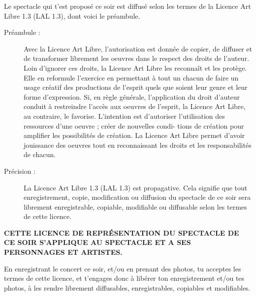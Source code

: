 Le spectacle qui t'est propos\'e ce soir est diffus\'e selon les
termes de la Licence Art Libre 1.3 (LAL 1.3), dont voici le
pr\'eambule.

\begin{description}
  \item[Pr\'eambule :] Avec la Licence Art Libre, l'autorisation est
  donn\'ee de copier, de diffuser et de transformer librement les
  oeuvres dans le respect des droits de l'auteur.  Loin d'ignorer ces
  droits, la Licence Art Libre les reconna\^it et les prot\`ege. Elle
  en reformule l'exercice en permettant \`a tout un chacun de faire un
  usage cr\'eatif des productions de l'esprit quels que soient leur
  genre et leur forme d'expression.  Si, en r\`egle g\'en\'erale,
  l'application du droit d'auteur conduit \`a restreindre l'acc\`es
  aux oeuvres de l'esprit, la Licence Art Libre, au contraire, le
  favorise. L'intention est d'autoriser l'utilisation des ressources
  d'une oeuvre ; cr\'eer de nouvelles condi- tions de cr\'eation pour
  amplifier les possibilit\'es de cr\'eation. La Licence Art Libre
  permet d'avoir jouissance des oeuvres tout en reconnaissant les
  droits et les responsabilit\'es de chacun.

  \item[Pr\'ecision :] La Licence Art Libre 1.3 (LAL 1.3) est
  propagative. Cela signifie que tout enregistrement, copie,
  modification ou diffusion du spectacle de ce soir sera librement
  enregistrable, copiable, modifiable ou diffusable selon les termes
  de cette licence.

\end{description}

\begin{center}
\textbf{CETTE LICENCE DE REPR\'ESENTATION DU SPECTACLE DE CE SOIR S'APPLIQUE AU
SPECTACLE ET A SES PERSONNAGES ET ARTISTES.}
\end{center}

En enregistrant le concert ce soir, et/ou en prenant des photos, tu
acceptes les termes de cette licence, et t'engages donc \`a lib\'erer
ton enregistrement et/ou tes photos, \`a les rendre librement
diffusables, enregistrables, copiables et modifiables.
